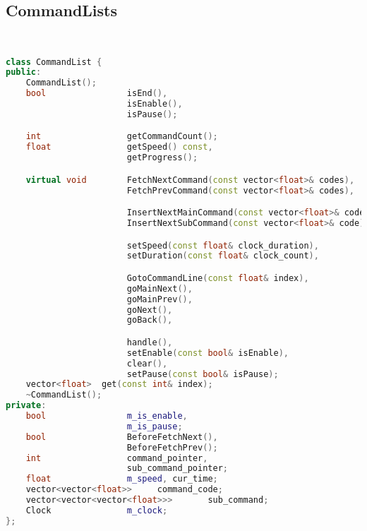 \subsection{CommandLists}
\begin{lstlisting}[language=C++]


class CommandList {
public:
    CommandList();
    bool                isEnd(),
                        isEnable(),
                        isPause();

    int                 getCommandCount();
    float               getSpeed() const,
                        getProgress();

    virtual void        FetchNextCommand(const vector<float>& codes),
                        FetchPrevCommand(const vector<float>& codes),

                        InsertNextMainCommand(const vector<float>& code),
                        InsertNextSubCommand(const vector<float>& code),

                        setSpeed(const float& clock_duration),
                        setDuration(const float& clock_count),

                        GotoCommandLine(const float& index),
                        goMainNext(),
                        goMainPrev(),
                        goNext(),
                        goBack(),

                        handle(),
                        setEnable(const bool& isEnable),
                        clear(),
                        setPause(const bool& isPause);
    vector<float>  get(const int& index);
    ~CommandList();
private:
    bool                m_is_enable,
                        m_is_pause;
    bool                BeforeFetchNext(),
                        BeforeFetchPrev();
    int                 command_pointer,
                        sub_command_pointer;
    float               m_speed, cur_time;
    vector<vector<float>>     command_code;
    vector<vector<vector<float>>>       sub_command;
    Clock               m_clock;
};






\end{lstlisting}

